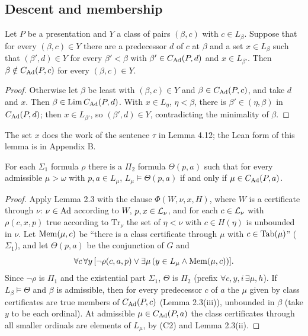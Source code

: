 \documentclass[11pt]{article}
\begin{document}
\subsection{Descent and membership}

\begin{statement} Let $P$ be a presentation and $Y$ a class of pairs
$(\beta, c)$ with $c \in L_\beta$. Suppose that for every $(\beta, c) \in Y$ there are a predecessor $d$ of $c$ at
$\beta$ and a set $x \in L_\beta$ such that $(\beta', d) \in Y$ for every $\beta' < \beta$ with $\beta' \in C_{\mathrm{Ad}}(P,d)$
and $x \in L_{\beta'}$. Then $\beta \notin C_{\mathrm{Ad}}(P,c)$ for every $(\beta, c) \in Y$.
\end{statement}

\begin{proof}
Otherwise let $\beta$ be least with $(\beta, c) \in Y$ and $\beta \in C_{\mathrm{Ad}}(P,c)$, and take $d$ and $x$. Then $\beta \in
\mathrm{Lim}\, C_{\mathrm{Ad}}(P,d)$. With $x \in L_\eta$, $\eta < \beta$, there is $\beta' \in (\eta, \beta)$ in $C_{\mathrm{Ad}}(P,d)$; then $x \in
L_{\beta'}$, so $(\beta', d) \in Y$, contradicting the minimality of $\beta$.
\end{proof}

The set $x$ does the work of the sentence $\tau$ in Lemma 4.12; the Lean form of this lemma is in Appendix B.

\begin{statement} For each $\Sigma_1$ formula $\rho$ there is a $\Pi_2$ formula $\Theta(p,a)$ such that
for every admissible $\mu > \omega$ with $p, a \in L_\mu$, $L_\mu \models \Theta(p,a)$ if and only if $\mu \in
C_{\mathrm{Ad}}(P,a)$.
\end{statement}

\begin{proof}
Apply Lemma 2.3 with the clause $\Phi(W, \nu, x, H)$, where $W$ is a certificate through $\nu$:
$\nu \in \mathrm{Ad}$ according to $W$, $p, x \in \mathcal{L}_\nu$, and for each $c \in \mathcal{L}_\nu$ with $\rho(c,x,p)$ true according to
$\mathrm{Tr}_\nu$ the set of $\eta < \nu$ with $c \in H(\eta)$ is unbounded in $\nu$. Let $\mathrm{Mem}(\mu, c)$ be ``there is
a class certificate through $\mu$ with $c \in \mathrm{Tab}(\mu)$'' ($\Sigma_1$), and let $\Theta(p,a)$ be the conjunction of $G$ and
\[ \forall c\, \forall y\, [\neg\rho(c,a,p) \vee \exists \mu\, (y \in L_\mu \wedge \mathrm{Mem}(\mu,c))]. \]
Since
$\neg\rho$ is $\Pi_1$ and the existential part $\Sigma_1$, $\Theta$ is $\Pi_2$ (prefix $\forall c, y, i\, \exists \mu,
h$). If $L_\beta \models \Theta$ and $\beta$ is admissible, then for every predecessor $c$ of $a$ the $\mu$ given by
class certificates are true members of $C_{\mathrm{Ad}}(P,c)$ (Lemma 2.3(iii)), unbounded in $\beta$ (take $y$ to be each
ordinal). At admissible $\mu \in C_{\mathrm{Ad}}(P,a)$ the class certificates through all smaller ordinals are elements of
$L_\mu$, by (C2) and Lemma 2.3(ii).
\end{proof}
\end{document}
